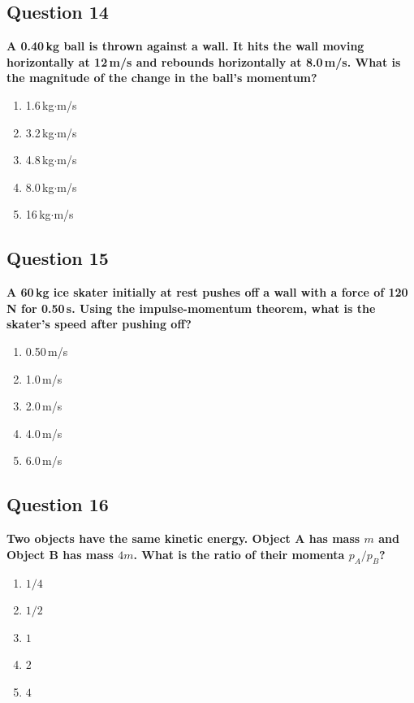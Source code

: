 \documentclass[12pt,letterpaper]{article}
\begin{document}
\subsection{Question 14}

\begin{questionbox}
\textbf{A 0.40\,kg ball is thrown against a wall. It hits the wall moving horizontally at 12\,m/s and rebounds horizontally at 8.0\,m/s. What is the magnitude of the change in the ball's momentum?}

\begin{enumerate}[label=\alph*)]
    \item 1.6\,kg$\cdot$m/s
    \item 3.2\,kg$\cdot$m/s
    \item 4.8\,kg$\cdot$m/s
    \item 8.0\,kg$\cdot$m/s
    \item 16\,kg$\cdot$m/s
\end{enumerate}
\end{questionbox}

\subsection{Question 15}

\begin{questionbox}
\textbf{A 60\,kg ice skater initially at rest pushes off a wall with a force of 120\,N for 0.50\,s. Using the impulse-momentum theorem, what is the skater's speed after pushing off?}

\begin{enumerate}[label=\alph*)]
    \item 0.50\,m/s
    \item 1.0\,m/s
    \item 2.0\,m/s
    \item 4.0\,m/s
    \item 6.0\,m/s
\end{enumerate}
\end{questionbox}

\subsection{Question 16}

\begin{questionbox}
\textbf{Two objects have the same kinetic energy. Object A has mass $m$ and Object B has mass $4m$. What is the ratio of their momenta $p_A/p_B$?}

\begin{enumerate}[label=\alph*)]
    \item $1/4$
    \item $1/2$
    \item $1$
    \item $2$
    \item $4$
\end{enumerate}
\end{questionbox}
\end{document}
